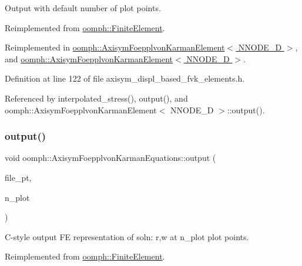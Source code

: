 Output with default number of plot points. 



Reimplemented from \hyperlink{classoomph_1_1FiniteElement_a2ad98a3d2ef4999f1bef62c0ff13f2a7}{oomph\+::\+Finite\+Element}.



Reimplemented in \hyperlink{classoomph_1_1AxisymFoepplvonKarmanElement_a76cf09e19fc810a96251a64572248f76}{oomph\+::\+Axisym\+Foepplvon\+Karman\+Element$<$ N\+N\+O\+D\+E\+\_\+D $>$}, and \hyperlink{classoomph_1_1AxisymFoepplvonKarmanElement_a76cf09e19fc810a96251a64572248f76}{oomph\+::\+Axisym\+Foepplvon\+Karman\+Element$<$ N\+N\+O\+D\+E\+\_\+D $>$}.



Definition at line 122 of file axisym\+\_\+displ\+\_\+based\+\_\+fvk\+\_\+elements.\+h.



Referenced by interpolated\+\_\+stress(), output(), and oomph\+::\+Axisym\+Foepplvon\+Karman\+Element$<$ N\+N\+O\+D\+E\+\_\+D $>$\+::output().

\mbox{\label{classoomph_1_1AxisymFoepplvonKarmanEquations_a5278f37c336b7a4bd2931fdedd2945f8}} 
\subsubsection{\texorpdfstring{output()}{output()}\hspace{0.1cm}{\footnotesize\ttfamily [5/8]}}
{\footnotesize\ttfamily void oomph\+::\+Axisym\+Foepplvon\+Karman\+Equations\+::output (\begin{DoxyParamCaption}\item[{F\+I\+LE $\ast$}]{file\+\_\+pt,  }\item[{const unsigned \&}]{n\+\_\+plot }\end{DoxyParamCaption})\hspace{0.3cm}{\ttfamily [virtual]}}



C-\/style output FE representation of soln\+: r,w at n\+\_\+plot plot points. 



Reimplemented from \hyperlink{classoomph_1_1FiniteElement_adfaee690bb0608f03320eeb9d110d48c}{oomph\+::\+Finite\+Element}.



